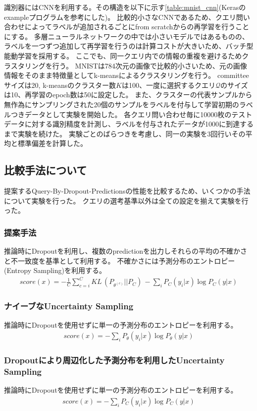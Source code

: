 識別器にはCNNを利用する。その構造を以下に示す\ref{table:mnist_cnn}(Kerasのexampleプログラムを参考にした)。
比較的小さなCNNであるため、クエリ問い合わせによってラベルが追加されるごとにfrom scratchからの再学習を行うことにする。
多層ニューラルネットワークの中では小さいモデルではあるものの、ラベルを一つずつ追加して再学習を行うのは計算コストが大きいため、バッチ型能動学習を採用する。
ここでも、同一クエリ内での情報の重複を避けるためクラスタリングを行う。
MNISTは784次元の画像で比較的小さいため、元の画像情報をそのまま特徴量としてk-meansによるクラスタリングを行う。
committeeサイズは20, k-meansのクラスター数$K$は100、一度に選択するクエリ$\mathcal{Q}$のサイズは10、再学習のepoch数は50に設定した。
また、クラスターの代表サンプルから無作為にサンプリングされた20個のサンプルをラベルを付与して学習初期のラベルつきデータとして実験を開始した。
各クエリ問い合わせ毎に10000枚のテストデータに対する識別精度を計測し、ラベルを付与されたデータが1000に到達するまで実験を続けた。
実験ごとのばらつきを考慮し、同一の実験を3回行いその平均と標準偏差を計算した。

\subsection{比較手法について}
提案するQuery-By-Dropout-Predictionsの性能を比較するため、いくつかの手法について実験を行った。
クエリの選考基準以外は全ての設定を揃えて実験を行った。

\subsubsection{提案手法}
推論時にDropoutを利用し、複数のpredictionを出力しそれらの平均の不確かさと不一致度を基準として利用する。
不確かさには予測分布のエントロピー(Entropy Sampling)を利用する。
\begin{eqnarray}
    score(x) =  -  \frac{1}{C} \sum_{c=i}^C KL \, (P_{\theta^{(c)}} || P_C) \, - \sum_i {P_C(y_i|x)} \log P_C(y|x)
\end{eqnarray}

\subsubsection{ナイーブなUncertainty Sampling}
推論時にDropoutを使用せずに単一の予測分布のエントロピーを利用する。
\begin{eqnarray}
    score(x) =  - \sum_i {P_{\theta}(y_i|x)} \log P_{\theta}(y|x)
\end{eqnarray}

\subsubsection{Dropoutにより周辺化した予測分布を利用したUncertainty Sampling}
推論時にDropoutを使用せずに単一の予測分布のエントロピーを利用する。
\begin{eqnarray}
    score(x) =  - \sum_i {P_C(y_i|x)} \log P_C(y|x)
\end{eqnarray}

